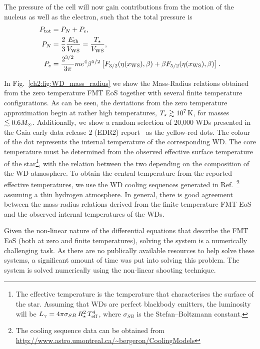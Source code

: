 The pressure of the cell will now gain contributions from the motion of the nucleus as well as the electron, such that the total pressure is
\begin{align}
    P_\mathrm{tot} & = P_N + P_e,\\
    P_N & = \frac{2}{3}\frac{E_\mathrm{th}}{V_\mathrm{WS}} = \frac{T_\star}{V_\mathrm{WS}},\\
    P_e & = \frac{2^{3/2}}{3\pi} me^4 \beta^{5/2}\left[  F_{3/2}(\eta(x_\mathrm{WS}), \beta) + \beta F_{5/2}(\eta(x_\mathrm{WS}), \beta)  \right].
\end{align}

In Fig.~\ref{ch2:fig:WD_mass_radius} we show the Mass-Radius relations obtained from the zero temperature FMT EoS together with several finite temperature configurations. As can be seen, the deviations from the zero temperature approximation begin at rather high temperatures, $T_\star\gtrsim 10^7{\rm \,K}$, for masses $\lesssim 0.6 M_\odot$. Additionally, we show a random selection of 20,000 WDs presented in the Gaia early data release 2 (EDR2) report~\cite{GentileFusillo_feb_GaiaDataRelease} as the yellow-red dots. The colour of the dot represents the internal temperature of the corresponding WD. The core temperature must be determined from the observed effective surface temperature of the star\footnote{The effective temperature is the temperature that characterises the surface of the star. Assuming that WDs are perfect blackbody emitters, the luminosity will be $L_\gamma = 4\pi \sigma_{SB} \, R_\star^2 \, T_{\rm eff}^4$, where $\sigma_{SB}$ is the Stefan–Boltzmann constant.}, with the relation between the two depending on the composition of the WD atmosphere. To obtain the central temperature from the reported effective temperatures, we use the WD cooling sequences generated in Ref.~\cite{Bedard_oct_Spectralevolutionhot}\footnote{The cooling sequence data can be obtained from \url{http://www.astro.umontreal.ca/~bergeron/CoolingModels}} assuming a thin hydrogen atmosphere. In general, there is good agreement between the mass-radius relations derived from the finite temperature FMT EoS and the observed internal temperatures of the WDs.

Given the non-linear nature of the differential equations that describe the FMT EoS (both at zero and finite temperatures), solving the system is a numerically challenging task. As there are no publically available resources to help solve these systems, a significant amount of time was put into solving this problem. The system is solved numerically using the non-linear shooting technique.

